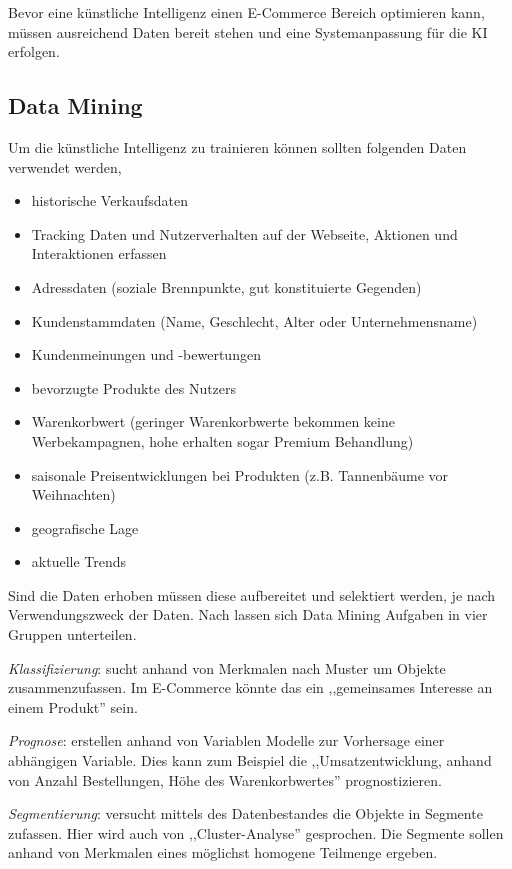Bevor eine künstliche Intelligenz einen E-Commerce Bereich optimieren kann, müssen ausreichend Daten bereit stehen und eine Systemanpassung für die KI erfolgen.

\subsection{Data Mining}
Um die künstliche Intelligenz zu trainieren können sollten folgenden Daten verwendet werden,

\begin{itemize}
	\item historische Verkaufsdaten
	\item Tracking Daten und Nutzerverhalten auf der Webseite, Aktionen und Interaktionen erfassen
	\item Adressdaten (soziale Brennpunkte, gut konstituierte Gegenden)
	\item Kundenstammdaten (Name, Geschlecht, Alter oder Unternehmensname)
	\item Kundenmeinungen und -bewertungen
	\item bevorzugte Produkte des Nutzers
	\item Warenkorbwert (geringer Warenkorbwerte bekommen keine Werbekampagnen, hohe erhalten sogar Premium Behandlung)
	\item saisonale Preisentwicklungen bei Produkten (z.B. Tannenbäume vor Weihnachten)
	\item geografische Lage
	\item aktuelle Trends
\end{itemize}

Sind die Daten erhoben müssen diese aufbereitet und selektiert werden, je nach Verwendungszweck der Daten. Nach \cite{laurenz_data_mining} lassen sich Data Mining Aufgaben in vier Gruppen unterteilen.\vspace{0.2cm}

\textit{Klassifizierung}: sucht anhand von Merkmalen nach Muster um Objekte zusammenzufassen. Im E-Commerce könnte das ein ,,gemeinsames Interesse an einem Produkt'' sein.\vspace{0.2cm}

\textit{Prognose}: erstellen anhand von Variablen Modelle zur Vorhersage einer abhängigen Variable. Dies kann zum Beispiel die ,,Umsatzentwicklung, anhand von Anzahl Bestellungen, Höhe des Warenkorbwertes'' prognostizieren.\vspace{0.2cm}

\textit{Segmentierung}: versucht mittels des Datenbestandes die Objekte in Segmente zufassen. Hier wird auch von ,,Cluster-Analyse'' gesprochen. Die Segmente sollen anhand von Merkmalen eines möglichst homogene Teilmenge ergeben.\vspace{0.2cm}

